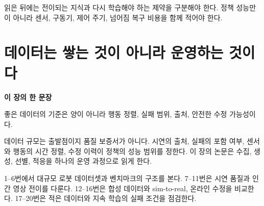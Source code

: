 \documentclass[11pt,openany]{book}
\newcommand{\chaptertakeaway}[1]{%
  \begin{tcolorbox}[
    breakable,
    colback=deepblue,
    colframe=deepblue,
    coltext=white,
    boxrule=0pt,
    arc=2mm,
    left=5mm,right=5mm,top=4mm,bottom=4mm
  ]
  {\sffamily\bfseries\large 이 장의 한 문장}\par\smallskip
  #1
  \end{tcolorbox}
}
\begin{document}
\begin{translationbox}[이 장을 덮기 전에]

읽은 뒤에는 전이되는 지식과 다시 학습해야 하는 제약을 구분해야 한다. 정책 성능만이 아니라 센서, 구동기, 제어 주기, 넘어짐 복구 비용을 함께 적어야 한다.

\end{translationbox}

\cleardoublepage

\chapter{데이터는 쌓는 것이 아니라 운영하는 것이다}

\chaptertakeaway{좋은 데이터의 기준은 양이 아니라 행동 정렬, 실패 범위, 출처, 안전한 수정 가능성이다.}

데이터 규모는 출발점이지 품질 보증서가 아니다. 시연의 출처, 실패의 포함 여부, 센서와 행동의 시간 정렬, 수정 이력이 정책의 성능 범위를 정한다. 이 장의 논문은 수집, 생성, 선별, 적응을 하나의 운영 과정으로 읽게 한다.

\begin{boardbox}[읽는 순서]

1--6번에서 대규모 로봇 데이터셋과 벤치마크의 구조를 본다. 7--11번은 시연 품질과 인간 영상 전이를 다룬다. 12--16번은 합성 데이터와 sim-to-real, 온라인 수정을 비교한다. 17--20번은 적은 데이터와 지속 학습의 실패 조건을 점검한다.

\end{boardbox}
\end{document}
